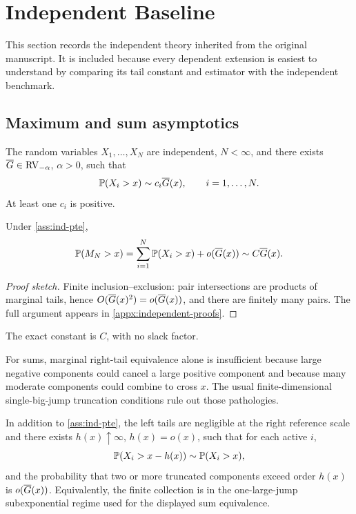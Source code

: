 \section{Independent Baseline}
\label{sec:independent-baseline}

This section records the independent theory inherited from the original
manuscript. It is included because every dependent extension is easiest to
understand by comparing its tail constant and estimator with the independent
benchmark.

\subsection{Maximum and sum asymptotics}

\begin{assumption}
\label{ass:ind-pte}
The random variables \(X_1,\ldots,X_N\) are independent, \(N<\infty\), and
there exists \(\overline{G}\in\mathrm{RV}_{-\alpha}\), \(\alpha>0\), such that
\[
  \mathbb{P}(X_i>x)\sim c_i\overline{G}(x), \qquad i=1,\ldots,N.
\]
At least one \(c_i\) is positive.
\end{assumption}

\begin{theorem}
\label{thm:catastrophe-exact}
Under \cref{ass:ind-pte},
\[
  \mathbb{P}(M_N>x)
  = \sum_{i=1}^N\mathbb{P}(X_i>x)+o(\overline{G}(x))
  \sim C\overline{G}(x).
\]
\end{theorem}

\begin{proof}[Proof sketch]
Finite inclusion--exclusion: pair intersections are products of marginal tails,
hence $O(\overline{G}(x)^2)=o(\overline{G}(x))$, and there are finitely many pairs. The full
argument appears in \cref{appx:independent-proofs}.
\end{proof}

The exact constant is \(C\), with no slack factor.

For sums, marginal right-tail equivalence alone is insufficient because large
negative components could cancel a large positive component and because many
moderate components could combine to cross \(x\). The usual finite-dimensional
single-big-jump truncation conditions rule out those pathologies.

\begin{assumption}
\label{ass:ind-sbj}
In addition to \cref{ass:ind-pte}, the left tails are negligible at the right
reference scale and there exists \(h(x)\uparrow\infty\), \(h(x)=o(x)\), such
that for each active \(i\),
\[
  \mathbb{P}(X_i>x-h(x))\sim \mathbb{P}(X_i>x),
\]
and the probability that two or more truncated components exceed order \(h(x)\)
is \(o(\overline{G}(x))\). Equivalently, the finite collection is in the one-large-jump
subexponential regime used for the displayed sum equivalence.
\end{assumption}

